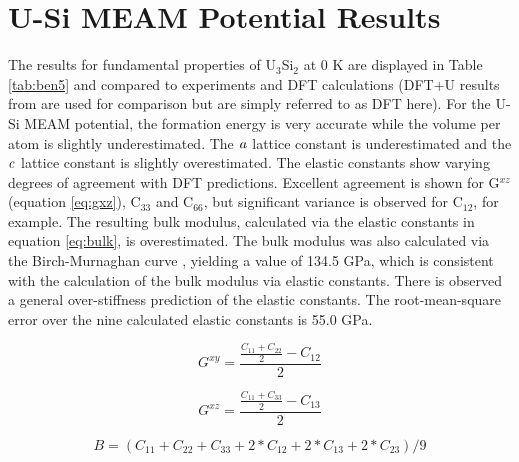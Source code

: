 \documentclass[review]{elsarticle}
\begin{document}
\clearpage

\section{U-Si MEAM Potential Results}

The results for fundamental properties of U$_{3}$Si$_{2}$ at 0 K are displayed in Table \ref{tab:ben5} and compared to experiments \cite{zachariasen1949, berche2009} and DFT calculations \cite{noordhoek2016} (DFT+U results from \cite{noordhoek2016} are used for comparison but are simply referred to as DFT here).  For the U-Si MEAM potential, the formation energy is very accurate while the volume per atom is slightly underestimated.  The $\it{a}$ lattice constant is underestimated and the $\it{c}$ lattice constant is slightly overestimated.  The elastic constants show varying degrees of agreement with DFT predictions.  Excellent agreement is shown for G$^{xz}$ (equation \ref{eq:gxz}), C$_{33}$ and C$_{66}$, but significant variance is observed for C$_{12}$, for example.  The resulting bulk modulus, calculated via the elastic constants in equation \ref{eq:bulk}, is overestimated.  The bulk modulus was also calculated via the Birch-Murnaghan curve \cite{cohen85, birch47}, yielding a value of 134.5 GPa, which is consistent with the calculation of the bulk modulus via elastic constants.  There is observed a general over-stiffness prediction of the elastic constants.  The root-mean-square error over the nine calculated elastic constants is 55.0 GPa.  

\begin{equation}
\label{eq:gxy}
G^{xy}= \frac{\frac{C_{11} + C_{22}}{2} - C_{12}}{2}
\end{equation}

\begin{equation}
\label{eq:gxz}
G^{xz}= \frac{\frac{C_{11} + C_{33}}{2} - C_{13}}{2}
\end{equation}

\begin{equation}
\label{eq:bulk}
B=(C_{11} + C_{22} + C_{33} + 2*C_{12} + 2*C_{13} + 2*C_{23})/9
\end{equation}
\end{document}
